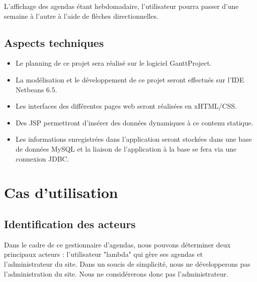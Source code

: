 \documentclass[12pt , a4paper]{article}
\begin{document}
L{\textquoteright}affichage des agendas \'etant hebdomadaire,
l{\textquoteright}utilisateur pourra passer d{\textquoteright}une
semaine \`a l{\textquoteright}autre \`a l{\textquoteright}aide de
fl\`eches directionnelles.

\subsection{Aspects techniques}

\begin{itemize}
\item Le planning de ce projet sera r\'ealis\'e sur le logiciel
  GanttProject.
\item La mod\'elisation et le d\'eveloppement de ce projet seront
  effectu\'es sur l{\textquoteright}IDE Netbeans 6.5.
\item Les interfaces des diff\'erentes pages web seront r\'ealis\'ees en
  xHTML/CSS.
\item Des JSP permettront d{\textquoteright}ins\'erer des donn\'ees
  dynamiques \`a ce contenu statique.
\item Les informations enregistr\'ees dans l{\textquoteright}application
  seront stock\'ees dans une base de donn\'ees MySQL et la liaison de
  l{\textquoteright}application \`a la base se fera via une connexion
  JDBC.
\end{itemize}

\newpage
\section{Cas d'utilisation}
\subsection{Identification des acteurs}
Dans le cadre de  ce gestionnaire d'agendas, nous pouvons déterminer deux  principaux acteurs : l'utilisateur "lambda" qui gère  ses agendas et l'administrateur du site. Dans  un soucis de simplicité,
nous ne développerons pas l'administration du site. Nous ne considérerons donc pas l'administrateur.
\end{document}
